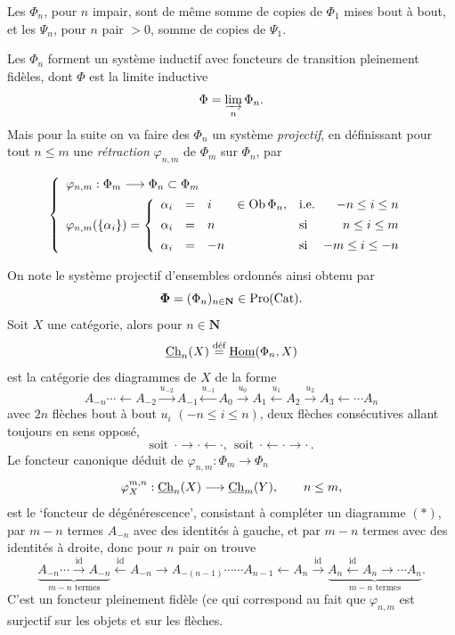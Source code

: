 Les $\Phi_n$, pour $n$ impair, sont de même somme de copies de $\Phi_1$ mises bout à bout, et les $\Psi_n$, pour $n$ pair $>0$, somme de copies de $\Psi_1$.

\clearpage


Les $\Phi_n$ forment un système inductif avec foncteurs de transition pleinement fidèles, dont $\Phi$ est la limite inductive
\[
\Phi=\varinjlim_n\Phi_n.
\]
Mais pour la suite on va faire des $\Phi_n$ un système \textit{projectif}, en définissant pour tout $n\le m$ une \textit{rétraction} $\varphi_{n,m}$ de $\Phi_m$ sur $\Phi_n$, par

\[
\left\{
\begin{array}{l}
\varphi_{n,m}:\Phi_m\longrightarrow\Phi_n\subset\Phi_m\\[1ex]
\varphi_{n,m}(\{\alpha_i\})=
\left\{
\begin{array}{rcll@{\quad}l@{\ \ }r}
\alpha_i & = & i & \in\Ob\Phi_n, & \text{i.e.} & -n\le i\le n\\[1ex]
\alpha_i & = & n & & \text{si} & n\le i\le m\\[1ex]
\alpha_i & = & -n & & \text{si} & -m\le i\le -n
\end{array}
\right.
\end{array}
\right.
\]

On note le système projectif d'ensembles ordonnés ainsi obtenu par
\[
\boldsymbol{\Phi}=(\Phi_n)_{n\in\mathbf{N}}\in\mathrm{Pro}(\mathrm{Cat}).
\]
Soit $X$ une catégorie, alors pour $n\in\mathbf{N}$
\[
\underline{\mathrm{Ch}}_n(X)\overset{\text{déf}}{=}\underline{\mathrm{Hom}}(\Phi_n,X)
\]
est la catégorie des diagrammes de $X$ de la forme
\[
A_{-n}\cdots\longleftarrow A_{-2}\xrightarrow{u_{-2}}A_{-1}\xleftarrow{u_{-1}}A_0\xrightarrow{u_0}A_1\xleftarrow{u_1}A_2\xrightarrow{u_2}A_3\longleftarrow\cdots A_n
\tag*{$(*)$}
\]
avec $2n$ flèches bout à bout $u_i$ $(-n\le i\le n)$, deux flèches consécutives allant toujours en sens opposé,
\[
\text{soit}\ \ \cdot\longrightarrow\cdot\longleftarrow\cdot,\ \ \text{soit}\ \ \cdot\longleftarrow\cdot\longrightarrow\cdot\,.
\]
Le foncteur canonique déduit de $\varphi_{n,m}:\Phi_m\longrightarrow\Phi_n$
\[
\varphi_X^{m,n}:\underline{\mathrm{Ch}}_n(X)\longrightarrow\underline{\mathrm{Ch}}_m(Y),\qquad n\le m,
\]
 est le `foncteur de dégénérescence', consistant à compléter un diagramme $(*)$, par $m-n$ termes $A_{-n}$ avec des identités à gauche, et par $m-n$ termes avec des identités à droite, donc pour $n$ pair on trouve
\[
\underbrace{A_{-n}\cdots\xrightarrow{\text{id}}A_{-n}}_{m-n\text{ termes}}\xleftarrow{\text{id}}A_{-n}\longrightarrow A_{-(n-1)}\cdots\cdots A_{n-1}\longleftarrow A_n\xrightarrow{\text{id}}\underbrace{A_n\xleftarrow{\text{id}}A_n\longrightarrow\cdots A_n}_{m-n\text{ termes}}.
\]
C'est un foncteur pleinement fidèle (ce qui correspond au fait que $\varphi_{n,m}$ est surjectif sur les objets et sur les flèches. %

